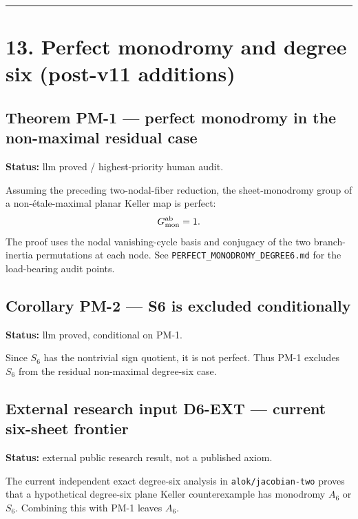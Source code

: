 \begin{center}\rule{0.5\linewidth}{0.5pt}\end{center}

\section{13. Perfect monodromy and degree six (post-v11
additions)}\label{perfect-monodromy-and-degree-six-post-v11-additions}

\subsection{Theorem PM-1 --- perfect monodromy in the non-maximal
residual
case}\label{theorem-pm-1-perfect-monodromy-in-the-non-maximal-residual-case}

\textbf{Status:} llm proved / highest-priority human audit.

Assuming the preceding two-nodal-fiber reduction, the sheet-monodromy
group of a non-étale-maximal planar Keller map is perfect: \[
G_{\rm mon}^{\rm ab}=1.
\] The proof uses the nodal vanishing-cycle basis and conjugacy of the
two branch-inertia permutations at each node. See
\texttt{PERFECT\_MONODROMY\_DEGREE6.md} for the load-bearing audit
points.

\subsection{Corollary PM-2 --- S6 is excluded
conditionally}\label{corollary-pm-2-s6-is-excluded-conditionally}

\textbf{Status:} llm proved, conditional on PM-1.

Since \(S_6\) has the nontrivial sign quotient, it is not perfect. Thus
PM-1 excludes \(S_6\) from the residual non-maximal degree-six case.

\subsection{External research input D6-EXT --- current six-sheet
frontier}\label{external-research-input-d6-ext-current-six-sheet-frontier}

\textbf{Status:} external public research result, not a published axiom.

The current independent exact degree-six analysis in
\texttt{alok/jacobian-two} proves that a hypothetical degree-six plane
Keller counterexample has monodromy \(A_6\) or \(S_6\). Combining this
with PM-1 leaves \(A_6\).

